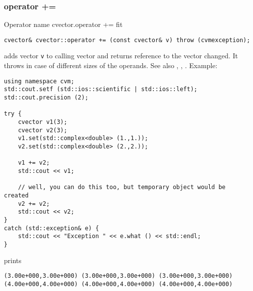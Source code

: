 \subsubsection{operator +=}
Operator%
\pdfdest name {cvector.operator +=} fit
\begin{verbatim}
cvector& cvector::operator += (const cvector& v) throw (cvmexception);
\end{verbatim}
adds vector \verb"v" to  calling vector 
and returns  reference to
the vector changed.
It throws  
in case of different sizes of the operands.
See also ,
,
.
Example:
\begin{Verbatim}
using namespace cvm;
std::cout.setf (std::ios::scientific | std::ios::left);
std::cout.precision (2);

try {
    cvector v1(3);
    cvector v2(3);
    v1.set(std::complex<double> (1.,1.));
    v2.set(std::complex<double> (2.,2.));

    v1 += v2;
    std::cout << v1;

    // well, you can do this too, but temporary object would be created
    v2 += v2;
    std::cout << v2;
}
catch (std::exception& e) {
    std::cout << "Exception " << e.what () << std::endl;
}
\end{Verbatim}
prints
\begin{Verbatim}
(3.00e+000,3.00e+000) (3.00e+000,3.00e+000) (3.00e+000,3.00e+000)
(4.00e+000,4.00e+000) (4.00e+000,4.00e+000) (4.00e+000,4.00e+000)
\end{Verbatim}
\newpage



